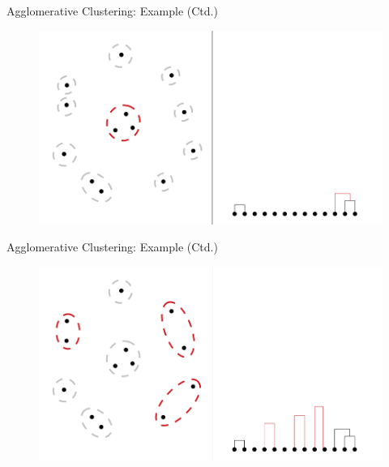\begin{frame}{Agglomerative Clustering: Example (Ctd.)}{}
	\begin{figure}
		\centering
		\includegraphics[scale=0.4]{12_clustering/02_img/aggl_clust_3}
	\end{figure}
\end{frame}


\begin{frame}{Agglomerative Clustering: Example (Ctd.)}{}
	\begin{figure}
		\centering
		\includegraphics[scale=0.4]{12_clustering/02_img/aggl_clust_4}
	\end{figure}
\end{frame}


